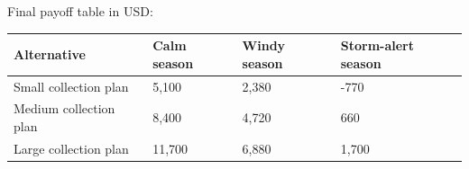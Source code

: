 Final payoff table in USD:
\begin{center}
\begin{tabular}{llll}
\toprule
Alternative & Calm season & Windy season & Storm-alert season \\
\midrule
Small collection plan & 5{,}100 & 2{,}380 & -770 \\
Medium collection plan & 8{,}400 & 4{,}720 & 660 \\
Large collection plan & 11{,}700 & 6{,}880 & 1{,}700 \\
\bottomrule
\end{tabular}
\end{center}

